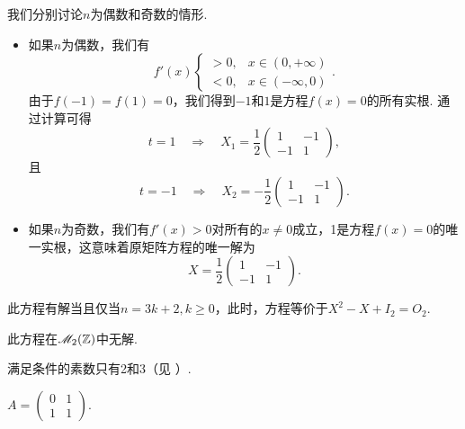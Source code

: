 \begin{solution}
  我们分别讨论$n$为偶数和奇数的情形.
  \begin{itemize}
    \item 如果$n$为偶数，我们有
    \[
      f'(x) \begin{cases}
        >0, & x\in(0,+\infty) \\
        <0, & x\in(-\infty,0)
      \end{cases}.
    \]
    由于$f(-1)=f(1)=0$，我们得到$-1$和$1$是方程$f(x)=0$的所有实根. 通过计算可得
    \[
      t=1 \quad \Rightarrow \quad X_1 = \frac12\begin{pmatrix}
        1 & - 1\\
        -1 & 1
      \end{pmatrix},
    \]
    且
    \[
      t = -1 \quad \Rightarrow \quad
      X_2 = -\frac12\begin{pmatrix}
        1 & - 1\\
        -1 & 1
      \end{pmatrix}.
    \]
    \item 如果$n$为奇数，我们有$f'(x)>0$对所有的$x\ne0$成立，1是方程$f(x)=0$的唯一实根，这意味着原矩阵方程的唯一解为
        \[
          X = \frac12\begin{pmatrix}
                 1 & - 1\\
                 -1 & 1
            \end{pmatrix}.
        \]
  \end{itemize}
\end{solution}

\begin{solution}
  \begin{inparaenum}[(a)]
    \item 此方程有解当且仅当$n=3k+2,k\ge0$，此时，方程等价于$X^2-X+I_2=O_2$.

    \item 此方程在$\mathscr M_2(\mathbb Z)$中无解.
  \end{inparaenum}
\end{solution}

\begin{solution}
  满足条件的素数只有2和3（见 \cite{46}）.
\end{solution}

\begin{solution}
  $A=\begin{pmatrix}
    0 & 1 \\
    1 & 1
  \end{pmatrix}$.
\end{solution}

